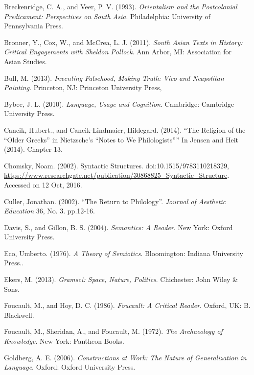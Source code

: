 \begin{thebibliography}{99}
 Breckenridge, C. A., and Veer, P. V. (1993). \textit{Orientalism and the Postcolonial Predicament: Perspectives on South Asia}. Philadelphia: University of Pennsylvania Press.

  Bronner, Y., Cox, W., and McCrea, L. J. (2011). \textit{South Asian Texts in History: Critical Engagements with Sheldon Pollock}. Ann Arbor, MI: Association for Asian Studies.

  Bull, M. (2013). \textit{Inventing Falsehood, Making Truth: Vico and Neapolitan Painting}. Princeton, NJ: Princeton University Press,

  Bybee, J. L. (2010). \textit{Language, Usage and Cognition}. Cambridge: Cambridge University Press.

  Cancik, Hubert., and Cancik-Lindmaier, Hildegard. (2014). “The Religion of the “Older Greeks” in Nietzsche’s “Notes to We Philologists”” In Jensen and Heit (2014). Chapter 13.

  Chomsky, Noam. (2002). Syntactic Structures. doi:10.1515/9783110218329, \url{https://www.researchgate.net/publication/30868825_Syntactic_Structure}. Accessed on 12 Oct, 2016.

  Culler, Jonathan. (2002). “The Return to Philology”. \textit{Journal of Aesthetic Education} 36, No. 3. pp.12-16.

  Davis, S., and Gillon, B. S. (2004). \textit{Semantics: A Reader}. New York: Oxford University Press.

  Eco, Umberto. (1976). \textit{A Theory of Semiotics}. Bloomington: Indiana University Press..

  Ekers, M. (2013). \textit{Gramsci: Space, Nature, Politics}. Chichester: John Wiley \& Sons.

  Foucault, M., and Hoy, D. C. (1986). \textit{Foucault: A Critical Reader}. Oxford, UK: B. Blackwell.

  Foucault, M., Sheridan, A., and Foucault, M. (1972). \textit{The Archaeology of Knowledge}. New York: Pantheon Books.

  Goldberg, A. E. (2006). \textit{Constructions at Work: The Nature of Generalization in Language}. Oxford: Oxford University Press.


\end{thebibliography}
